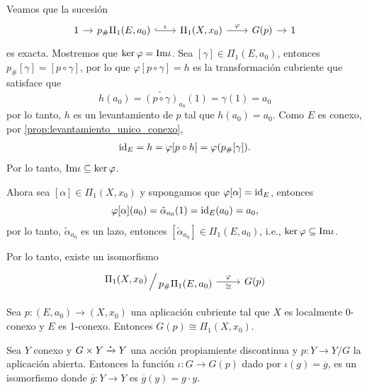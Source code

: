 \begin{dem}
Veamos que la sucesión 
\begin{equation*}
    \begin{tikzcd}[column sep=0.75cm]
        1\arrow[r] &[-0.4cm]p_\#\Pi_1(E,a_0)\arrow[r, "\iota",hook]& \Pi_1(X,x_0)\arrow[r,"\varphi"] & G(p)\arrow[r]&[-0.4cm] 1
    \end{tikzcd}
\end{equation*}
es exacta. Mostremos que $\ker\varphi=\mathrm{Im}\iota$. Sea $[\gamma]\in\Pi_1(E,a_0)$, entonces $p_\#[\gamma]=[p\circ\gamma]$, por lo que $\varphi[p\circ \gamma]=h$ es la transformación cubriente que satisface que 
\begin{equation*}
    h(a_0)=\widetilde{(p\circ\gamma)}_{a_0}(1)=\gamma(1)=a_0
\end{equation*}
por lo tanto, $h$ es un levantamiento de $p$ tal que $h(a_0)=a_0$. Como $E$ es conexo, por \ref{prop:levantamiento_unico_conexo}, 
\begin{align*}
    \mathrm{id}_E=h=\varphi[p\circ h]=\varphi(p_\#[\gamma]).
\end{align*}
Por lo tanto, $\mathrm{Im}\iota\subseteq\ker\varphi$. 

Ahora sea $[\alpha]\in\Pi_1(X,x_0)$ y supongamos que $\varphi[\alpha]=\mathrm{id}_E$, entonces 
\begin{equation*}
    \varphi[\alpha](a_0)=\tilde{\alpha}_{a_0}(1)=\mathrm{id}_E(a_0)=a_0,
\end{equation*}
por lo tanto, $\tilde{\alpha}_{a_0}$ es un lazo, entonces $[\tilde{\alpha}_{a_0}]\in\Pi_1(E,a_0)$, i.e., $\ker\varphi\subseteq \mathrm{Im}\iota$.

Por lo tanto, existe un isomorfismo 
\begin{equation*}
    \begin{tikzcd}
        \raisebox{0.55ex}{$\Pi_1(X,x_0)$} \,\Big/\, \raisebox{-0.55ex}{$p_\#\Pi_1(E,a_0)$}\arrow[r,"\varphi", "\cong"']& G(p)
    \end{tikzcd}
\end{equation*}
\end{dem}
\begin{coro}
    Sea $p:(E,a_0)\to(X,x_0)$ una aplicación cubriente tal que $X$ es localmente 0-conexo y $E$ es 1-conexo. Entonces $G(p)\cong \Pi_1(X,x_0)$.
\end{coro}
\begin{ejercicio}
\label{eje: G cong G(p)}
    Sea $Y$ conexo y $G\times Y\xrightarrow{\bigdot} Y$ una acción propiamiente discontinua y $p:Y\to Y/G$ la aplicación abierta. Entonces la función $\iota:G\to G(p)$ dado por $\iota(g)=\overline{g}$, es un isomorfismo donde $\overline{g}:Y\to Y$ es $\overline{g}(y)=g\cdot y.$ 
\end{ejercicio}

